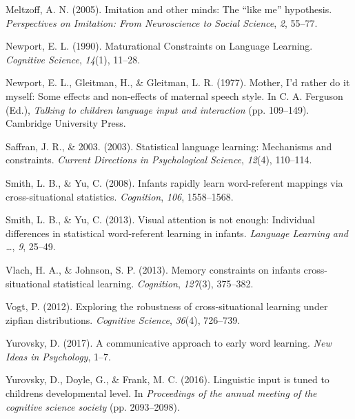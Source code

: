 \documentclass[10pt, letterpaper]{article}
\begin{document}
\hypertarget{ref-meltzoff2005}{}
Meltzoff, A. N. (2005). Imitation and other minds: The ``like me''
hypothesis. \emph{Perspectives on Imitation: From Neuroscience to Social
Science}, \emph{2}, 55--77.

\hypertarget{ref-newport1990}{}
Newport, E. L. (1990). Maturational Constraints on Language Learning.
\emph{Cognitive Science}, \emph{14}(1), 11--28.

\hypertarget{ref-newport1977}{}
Newport, E. L., Gleitman, H., \& Gleitman, L. R. (1977). Mother, I'd
rather do it myself: Some effects and non-effects of maternal speech
style. In C. A. Ferguson (Ed.), \emph{Talking to children language input
and interaction} (pp. 109--149). Cambridge University Press.

\hypertarget{ref-saffran2003}{}
Saffran, J. R., \& 2003. (2003). Statistical language learning:
Mechanisms and constraints. \emph{Current Directions in Psychological
Science}, \emph{12}(4), 110--114.

\hypertarget{ref-smith2008}{}
Smith, L. B., \& Yu, C. (2008). Infants rapidly learn word-referent
mappings via cross-situational statistics. \emph{Cognition}, \emph{106},
1558--1568.

\hypertarget{ref-smith2013}{}
Smith, L. B., \& Yu, C. (2013). Visual attention is not enough:
Individual differences in statistical word-referent learning in infants.
\emph{Language Learning and \ldots{}}, \emph{9}, 25--49.

\hypertarget{ref-vlach2013}{}
Vlach, H. A., \& Johnson, S. P. (2013). Memory constraints on infants
cross-situational statistical learning. \emph{Cognition}, \emph{127}(3),
375--382.

\hypertarget{ref-vogt2012}{}
Vogt, P. (2012). Exploring the robustness of cross-situational learning
under zipfian distributions. \emph{Cognitive Science}, \emph{36}(4),
726--739.

\hypertarget{ref-yurovsky2017}{}
Yurovsky, D. (2017). A communicative approach to early word learning.
\emph{New Ideas in Psychology}, 1--7.

\hypertarget{ref-yurovsky2016}{}
Yurovsky, D., Doyle, G., \& Frank, M. C. (2016). Linguistic input is
tuned to childrens developmental level. In \emph{Proceedings of the
annual meeting of the cognitive science society} (pp. 2093--2098).


\end{document}
